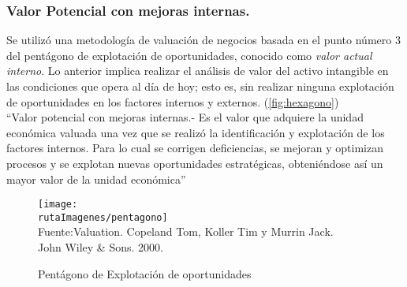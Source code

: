 \begin{rightcolumn}

\subsubsection{Valor Potencial con mejoras internas.}

Se utilizó una metodología de valuación de negocios basada en el punto número 3 del pentágono de explotación de oportunidades, conocido como \textit{valor actual interno}. Lo anterior  implica realizar el análisis de valor del activo intangible en las condiciones que opera al día de hoy; esto es, sin realizar ninguna explotación de oportunidades en los factores internos y externos. (\autoref{fig:hexagono}) \\

``\textcolor{secundario}{Valor potencial con mejoras internas}.- Es el valor que adquiere la unidad econ\'omica valuada una vez que se realiz\'o la identificaci\'on y explotaci\'on de los factores internos. Para lo cual se corrigen deficiencias, se mejoran y optimizan procesos y se explotan nuevas oportunidades estrat\'egicas, obteni\'endose as\'i un mayor valor de la unidad econ\'omica''\\

\end{rightcolumn}
\begin{leftcolumn}

\begin{figure}[H]
\centering
\caption{Pent\'agono de Explotaci\'on de oportunidades\label{fig:hexagono}}
\texttt{[image: \\rutaImagenes/pentagono]}\\
Fuente:Valuation. Copeland Tom, Koller Tim y Murrin Jack.\\

John Wiley \& Sons. 2000.
\end{figure}

\end{leftcolumn}

